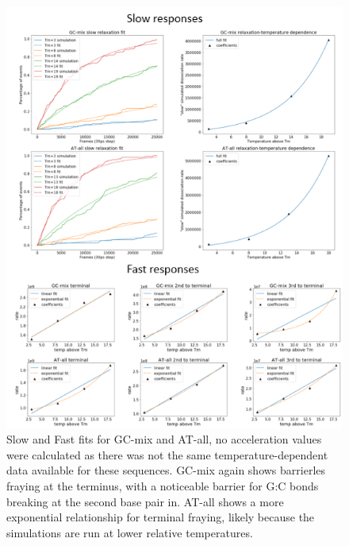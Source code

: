 \documentclass[journal=jpcbfk,manuscript=article]{achemso}
\begin{document}
\begin{figure}[ht!]
	\begin{center}
        \includegraphics[width=\textwidth]{Figs/figs_0804/fast-slow_all-mix.png}
        \caption{Slow and Fast fits for GC-mix and AT-all, no acceleration values were calculated as there was not the same temperature-dependent data available for these sequences. GC-mix again shows barrierles fraying at the terminus, with a noticeable barrier for G:C bonds breaking at the second base pair in. AT-all shows a more exponential relationship for terminal fraying, likely because the simulations are run at lower relative temperatures.}
        \label{fig:relaxation-comparison_mix_and_all}
	\end{center}
\end{figure}
\end{document}
